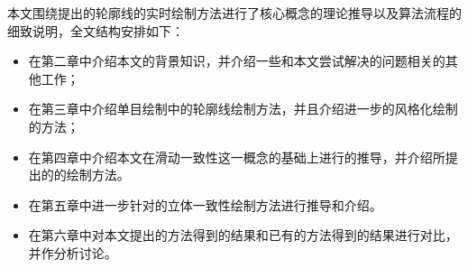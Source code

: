 本文围绕提出的\stc{}轮廓线的实时绘制方法进行了核心概念的理论推导以及算法流程的细致说明，全文结构安排如下：

\begin{itemize}
    \item 在第二章中介绍本文的背景知识，并介绍一些和本文尝试解决的问题相关的其他工作；
    \item 在第三章中介绍单目绘制中的轮廓线绘制方法，并且介绍进一步的风格化绘制的方法；
    \item 在第四章中介绍本文在滑动一致性这一概念的基础上进行的推导，并介绍所提出的\stc{}\con{}的绘制方法。
    \item 在第五章中进一步针对\scon{}的立体一致性绘制方法进行推导和介绍。
    \item 在第六章中对本文提出的方法得到的结果和已有的方法得到的结果进行对比，并作分析讨论。
\end{itemize}